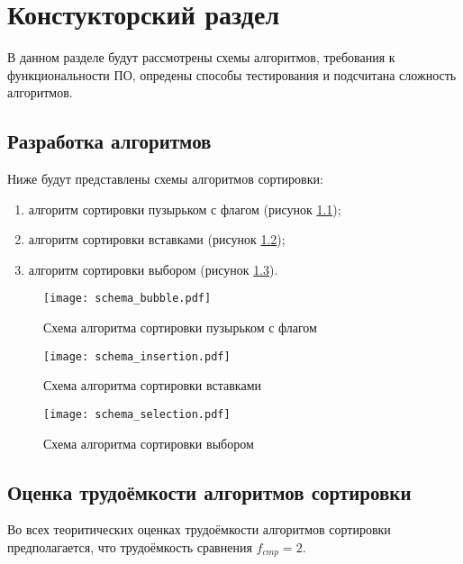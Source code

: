 \chapter{ Констукторский раздел}
\label{cha:design}
    В данном разделе будут рассмотрены схемы алгоритмов, требования к функциональности ПО,
    опредены способы тестирования и подсчитана сложность алгоритмов.
    
    \section{Разработка алгоритмов}
        Ниже будут представлены схемы алгоритмов сортировки: \begin{enumerate}
            \item алгоритм сортировки пузырьком с флагом (рисунок \ref{schema:sort:bubble});
            \item алгоритм сортировки вставками  (рисунок \ref{schema:sort:insertion});
            \item алгоритм сортировки выбором (рисунок \ref{schema:sort:selection}).
        \end{enumerate}

    \begin{figure}[h!]
        \centering
            \texttt{[image: schema\_bubble.pdf]}
            \caption{Схема алгоритма сортировки пузырьком с флагом}
            \label{schema:sort:bubble}
    \end{figure}

    \begin{figure}[h!]
        \centering
            \texttt{[image: schema\_insertion.pdf]}
            \caption{Схема алгоритма сортировки вставками}
            \label{schema:sort:insertion}
    \end{figure}

    \begin{figure}[h!]
        \centering
            \texttt{[image: schema\_selection.pdf]}
            \caption{Схема алгоритма сортировки выбором}
            \label{schema:sort:selection}
    \end{figure}

\section{Оценка трудоёмкости алгоритмов сортировки}
        Во всех теоритических оценках трудоёмкости
        алгоритмов сортировки предполагается, что
        трудоёмкость сравнения $ f_{cmp} = 2 $.

